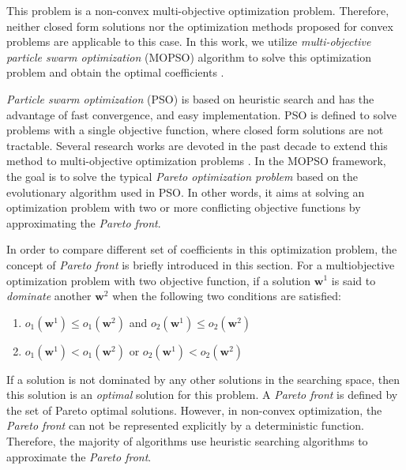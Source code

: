 This problem is a non-convex multi-objective optimization problem. Therefore, neither closed form solutions nor the optimization methods proposed for convex problems are applicable to this case. In this work, we utilize \textit{multi-objective particle swarm optimization} (MOPSO) algorithm to solve this optimization problem and obtain the optimal coefficients \cite{coello2002mopso}.

\textit{Particle swarm optimization} (PSO) is based on heuristic search and has the advantage of fast convergence, and easy implementation\cite{coello2002mopso, alvarez2005mopso}. PSO is defined to solve problems with a single objective function, where closed form solutions are not tractable.  Several research works are devoted in the past decade to extend this method to multi-objective optimization problems \cite{sierra2005improving, coello2005recent}. In the MOPSO framework, the goal is to solve the typical \textit{Pareto optimization problem} based on the evolutionary algorithm used in PSO. In other words, it aims at solving an optimization problem with two or more conflicting objective functions by approximating the \textit{Pareto front}. 


In order to compare different set of coefficients in this optimization problem, the concept of \textit{Pareto front} is briefly introduced in this section. For a multiobjective optimization problem with two objective function, if a solution $\mathbf{w}^1$ is said to \textit{dominate} another $\mathbf{w}^2$ when the following two conditions are satisfied:
\begin{enumerate}
    \item $o_1(\mathbf{w}^1) \leq  o_1(\mathbf{w}^2)$ and $o_2(\mathbf{w}^1) \leq  o_2(\mathbf{w}^2)$ 
    \item $o_1(\mathbf{w}^1) <  o_1(\mathbf{w}^2)$ or $o_2(\mathbf{w}^1) < o_2(\mathbf{w}^2)$ 
\end{enumerate}

If a solution is not dominated by any other solutions in the searching space, then this solution is an \textit{optimal} solution for this problem. A \textit{Pareto front} is defined by the set of Pareto optimal solutions. However, in non-convex optimization, the \textit{Pareto front} can not be represented explicitly by a deterministic function. Therefore, the majority of algorithms use heuristic searching algorithms to approximate the \textit{Pareto front}\cite{coello2002mopso}.


